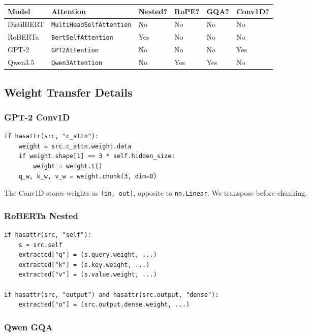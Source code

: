 \begin{table}[H]
\centering
\small
\begin{tabular}{llllll}
\toprule
\textbf{Model} & \textbf{Attention} & \textbf{Nested?} & \textbf{RoPE?} & \textbf{GQA?} & \textbf{Conv1D?} \\
\midrule
DistilBERT & \texttt{MultiHeadSelfAttention} & No & No & No & No \\
RoBERTa & \texttt{BertSelfAttention} & Yes & No & No & No \\
GPT-2 & \texttt{GPT2Attention} & No & No & No & Yes \\
Qwen3.5 & \texttt{Qwen3Attention} & No & Yes & Yes & No \\
\bottomrule
\end{tabular}
\end{table}

\subsection{Weight Transfer Details}

\subsubsection{GPT-2 Conv1D}

\begin{lstlisting}
if hasattr(src, "c_attn"):
    weight = src.c_attn.weight.data
    if weight.shape[1] == 3 * self.hidden_size:
        weight = weight.t()
    q_w, k_w, v_w = weight.chunk(3, dim=0)
\end{lstlisting}

The Conv1D stores weights as \texttt{(in, out)}, opposite to \texttt{nn.Linear}. We 
transpose before chunking.

\subsubsection{RoBERTa Nested}

\begin{lstlisting}
if hasattr(src, "self"):
    s = src.self
    extracted["q"] = (s.query.weight, ...)
    extracted["k"] = (s.key.weight, ...)
    extracted["v"] = (s.value.weight, ...)

if hasattr(src, "output") and hasattr(src.output, "dense"):
    extracted["o"] = (src.output.dense.weight, ...)
\end{lstlisting}

\subsubsection{Qwen GQA}

